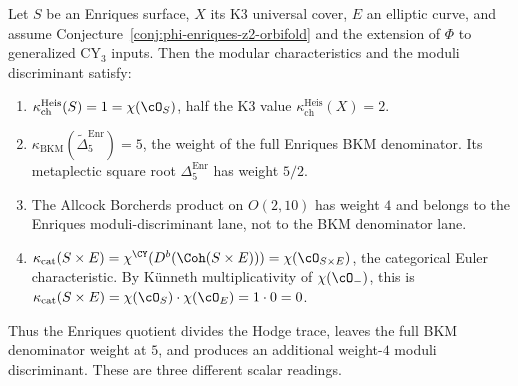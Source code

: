 \begin{conjecture}
\label{conj:enriques-kappa-spectrum}
\ClaimStatusConjectured
Let $S$ be an Enriques surface, $X$ its K3 universal cover, $E$ an elliptic curve, and assume Conjecture~\textup{\ref{conj:phi-enriques-z2-orbifold}} and the extension of $\Phi$ to generalized CY$_3$ inputs. Then the modular characteristics and the moduli discriminant satisfy:
\begin{enumerate}[label=\textup{(\roman*)}]
 \item $\kappa_{\mathrm{ch}}^{\mathrm{Heis}}(S) = 1 = \chi(\cO_S)$, half the K3 value $\kappa_{\mathrm{ch}}^{\mathrm{Heis}}(X) = 2$.
 \item $\kappa_{\mathrm{BKM}}(\widetilde\Delta^{\mathrm{Enr}}_5)=5$, the weight of the full Enriques BKM denominator. Its metaplectic square root \(\Delta^{\mathrm{Enr}}_5\) has weight \(5/2\).
 \item The Allcock Borcherds product on \(O(2,10)\) has weight \(4\) and belongs to the Enriques moduli-discriminant lane, not to the BKM denominator lane.
 \item $\kappa_{\mathrm{cat}}(S \times E) = \chi^{\CY}(D^b(\Coh(S \times E))) = \chi(\cO_{S \times E})$, the categorical Euler characteristic. By K\"unneth multiplicativity of $\chi(\cO_{-})$, this is $\kappa_{\mathrm{cat}}(S \times E) = \chi(\cO_S) \cdot \chi(\cO_E) = 1 \cdot 0 = 0$.
\end{enumerate}
Thus the Enriques quotient divides the Hodge trace, leaves the full
BKM denominator weight at \(5\), and produces an additional weight-\(4\)
moduli discriminant.  These are three different scalar readings.
\end{conjecture}

